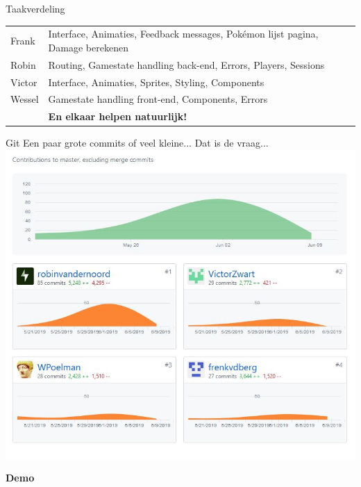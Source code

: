 \documentclass{beamer}
\begin{document}
\begin{frame}{Taakverdeling}
	\begin{table}
		\centering %
		\begin{tabular}{l l}
			Frank & {\tiny Interface, Animaties, Feedback messages, Pokémon lijst pagina, Damage berekenen}\\
			Robin & {\tiny Routing, Gamestate handling back-end, Errors, Players, Sessions}\\
			Victor & {\tiny Interface, Animaties, Sprites, Styling, Components}\\
			Wessel & {\tiny Gamestate handling front-end, Components, Errors}\\
			\midrule
			& \textbf{En elkaar helpen natuurlijk!} \\
			\bottomrule
		\end{tabular}
	\end{table}
\end{frame}


\begin{frame}{Git}
	\centering
	Een paar grote commits of veel kleine... Dat is de vraag...\\
	\bigskip
	\includegraphics[scale=0.3]{Images/git.jpg}
\end{frame}


\begin{frame}[focus]
	\textbf{Demo}
\end{frame}
\end{document}
